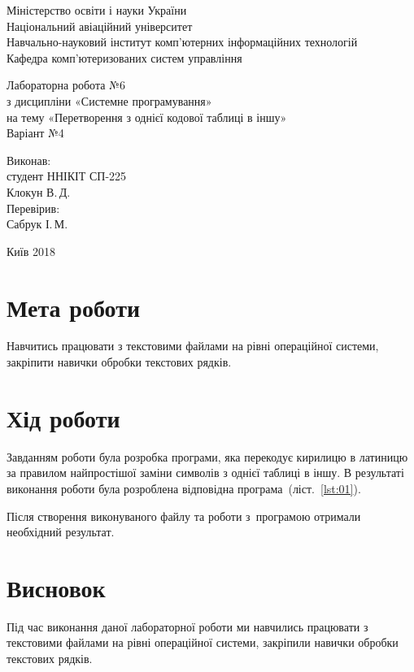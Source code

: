 \documentclass[a4paper,oneside,DIV=12,12pt,headings=normal]{scrartcl}
\begin{document}
	\begin{titlepage}
	\centering
		Міністерство освіти і науки України\\
		Національний авіаційний університет\\
		Навчально-науковий інститут комп'ютерних інформаційних технологій\\
		Кафедра комп'ютеризованих систем управління

		\vspace*{\fill}

		Лабораторна робота №6\\
		з дисципліни «Системне програмування»\\
		на тему «Перетворення з однієї кодової таблиці в іншу»\\
		Варіант №4

		\vspace*{\fill}
		
		\begin{flushright}
			Виконав:\\
			студент ННІКІТ СП-225\\
			Клокун В.\,Д.\\
			Перевірив:\\
			Сабрук І.\,М.
		\end{flushright}

		Київ 2018
    \end{titlepage}
	
	\section{Мета роботи}
		Навчитись працювати з текстовими файлами на рівні операційної системи, закріпити навички обробки текстових рядків.
		
	\section{Хід роботи}
		Завданням роботи була розробка програми, яка перекодує кирилицю в латиницю за правилом найпростішої заміни символів з однієї таблиці в іншу. В результаті виконання роботи була розроблена відповідна програма~(ліст.~\ref{lst:01}).
		
		Після створення виконуваного файлу та роботи з~програмою отримали необхідний результат.
		
	\section{Висновок}
		Під час виконання даної лабораторної роботи ми навчились працювати з текстовими файлами на рівні операційної системи, закріпили навички обробки текстових рядків.
		
\end{document}
